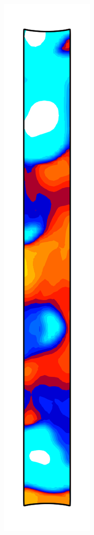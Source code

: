 \begin{figure}[!htb]
\begin{subfigure}{0.08\textwidth}
  \end{subfigure}
  \begin{subfigure}{0.08\textwidth}
    \centering
    \includegraphics[width=\textwidth]{Chapter5/figures/spallation/c_2}

\end{subfigure}
\end{figure}
